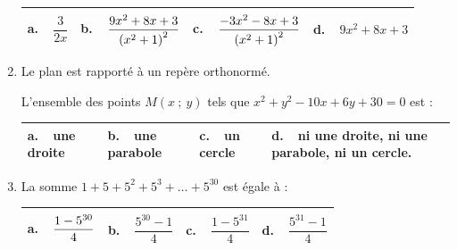 \begin{enumerate}
\begin{center}
\begin{tabularx}{\linewidth}{|*{4}{X|}}\hline
\textbf{a.~~}$\dfrac{3}{2x}$&\textbf{b.~~}$\dfrac{9x^2+8x+3\rule{0pt}{10pt}}{\left(x^2+1\right)^2}$&\textbf{c.~~}$\dfrac{-3x^2- 8x+3\rule{0pt}{10pt}}{\left(x^2+1\right)^2}$&\textbf{d.~~}$9x^2 + 8x+ 3$\\ \hline
\end{tabularx}
\end{center}

\item  Le plan est rapporté à un repère orthonormé.

L'ensemble des points $M(x~;~y)$ tels que $x^2 + y^2 - 10x +6y +30 = 0$ est :

\begin{center}
\begin{tabularx}{\linewidth}{|*{4}{X|}}\hline
\textbf{a.~~}une droite&\textbf{b.~~}une parabole&\textbf{c.~~}un cercle&\textbf{d.~~}ni une droite, ni une parabole, ni un cercle.\\ \hline
\end{tabularx}
\end{center}

\item La somme $1 + 5 + 5^2 + 5^3 + \ldots + 5^{30}$ est égale à :

\begin{center}
\begin{tabularx}{\linewidth}{|*{4}{X|}}\hline
\textbf{a.~~}$\dfrac{1 - 5^{30}\rule{0pt}{10pt}}{4\rule[-3pt]{0pt}{0pt}}$
&\textbf{b.~~}$\dfrac{5^{30} - 1}{4}$
&\textbf{c.~~}$\dfrac{1 - 5^{31}}{4}$
&\textbf{d.~~}$\dfrac{5^{31} - 1}{4}$\\ \hline
\end{tabularx}
\end{center}
\end{enumerate}

\bigskip
